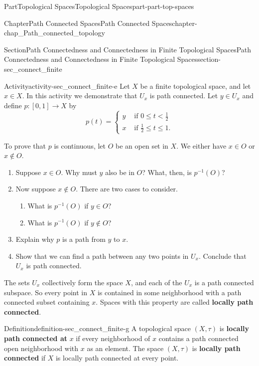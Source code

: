 \documentclass[oneside,10pt,]{book}
\newcommand{\terminology}[1]{\textbf{#1}}
\numberwithin{equation}{chapter}
\newcommand{\lt}{<}
\newcommand{\amp}{&}
\begin{document}
\begin{partptx}{Part}{Topological Spaces}{}{Topological Spaces}{}{}{part-part-top-spaces}
\begin{chapterptx}{Chapter}{Path Connected Spaces}{}{Path Connected Spaces}{}{}{chapter-chap_Path_connected_topology}
\begin{sectionptx}{Section}{Path Connectedness and Connectedness in Finite Topological Spaces}{}{Path Connectedness and Connectedness in Finite Topological Spaces}{}{}{section-sec_connect_finite}
\begin{activity}{Activity}{}{activity-sec_connect_finite-e}%
Let \(X\) be a finite topological space, and let \(x \in X\). In this activity we demonstrate that \(U_x\) is path connected. Let \(y \in U_x\) and define \(p : [0,1] \to X\) by%
\begin{equation*}
p(t) = \begin{cases}y \amp \text{ if }  0 \leq t \lt  \frac{1}{2} \\ x \amp \text{ if }  \frac{1}{2} \leq t \leq 1. \end{cases}
\end{equation*}
%
\par
To prove that \(p\) is continuous, let \(O\) be an open set in \(X\). We either have \(x \in O\) or \(x \notin O\).%
\begin{enumerate}[font=\bfseries,label=(\alph*),ref=\alph*]%
\item{}Suppose \(x \in O\). Why must \(y\) also be in \(O\)? What, then, is \(p^{-1}(O)\)?%
\item{}Now suppose \(x \notin O\). There are two cases to consider.%
\begin{enumerate}[font=\bfseries,label=(\roman*),ref=\theenumi.\roman*]%
\item{}What is \(p^{-1}(O)\) if \(y \in O\)?%
\item{}What is \(p^{-1}(O)\) if \(y \notin O\)?%
\end{enumerate}%
\item{}Explain why \(p\) is a path from \(y\) to \(x\).%
\item{}Show that we can find a path between any two points in \(U_x\). Conclude that \(U_x\) is path connected.%
\end{enumerate}%
\end{activity}%
The sets \(U_x\) collectively form the space \(X\), and each of the \(U_x\) is a path connected subspace. So every point in \(X\) is contained in some neighborhood with a path connected subset containing \(x\). Spaces with this property are called \terminology{locally path connected}.%
\begin{definition}{Definition}{}{definition-sec_connect_finite-g}%
%
A topological space \((X, \tau)\) is \terminology{locally path connected at} \(x\) if every neighborhood of \(x\) contains a path connected open neighborhood with \(x\) as an element. The space \((X, \tau)\) is \terminology{locally path connected} if \(X\) is locally path connected at every point.%
\end{definition}

\end{sectionptx}
\end{chapterptx}
\end{partptx}
\end{document}
